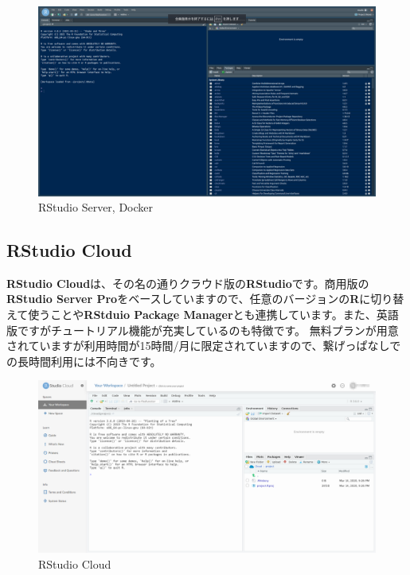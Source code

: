 \documentclass[
  12pt,
]{book}
\begin{document}
\begin{figure}[H]

{\centering \includegraphics[width=0.85\linewidth,]{./fig/RStudio/RStudioServer} 

}

\caption{RStudio Server, Docker}\label{fig:unnamed-chunk-18}
\end{figure}

\hypertarget{rstudio-cloud}{%
\subsection{RStudio Cloud}\label{rstudio-cloud}}

\textbf{RStudio Cloud}は、その名の通りクラウド版の\textbf{RStudio}です。商用版の\textbf{RStudio Server Pro}をベースしていますので、任意のバージョンの\textbf{R}に切り替えて使うことや\textbf{RStduio Package Manager}とも連携しています。また、英語版ですがチュートリアル機能が充実しているのも特徴です。 無料プランが用意されていますが利用時間が15時間/月に限定されていますので、繋げっぱなしでの長時間利用には不向きです。

\begin{figure}[H]

{\centering \includegraphics[width=0.85\linewidth,]{./fig/RStudio/RSCloud_01} 

}

\caption{RStudio Cloud}\label{fig:unnamed-chunk-19}
\end{figure}
\end{document}
